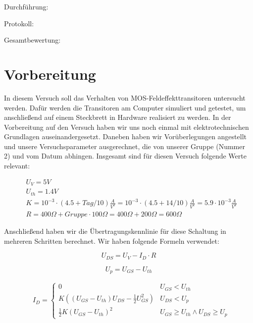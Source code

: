 \documentclass[12pt,a4paper]{scrartcl}
\begin{document}
Durchf\"uhrung:

Protokoll:

Gesamtbewertung:
\clearpage



\section{Vorbereitung}
In diesem Versuch soll das Verhalten von MOS-Feldeffekttransitoren untersucht werden.
Daf\"ur werden die Transitoren am Computer simuliert und getestet, um anschlie\ss end auf einem Steckbrett in Hardware realisiert zu werden.
In der Vorbereitung auf den Versuch haben wir uns noch einmal mit elektrotechnischen Grundlagen auseinandergesetzt.
Daneben haben wir Vor\"uberlegungen angestellt und unsere Versuchsparameter ausgerechnet, die von unserer Gruppe (Nummer 2) und vom Datum abhingen.
Insgesamt sind f\"ur diesen Versuch folgende Werte relevant:

\begin{align} \label{eq:geg}
&U_V = 5V \nonumber \\
&U_{th} = 1.4V \nonumber \\
&K = 10^{-3} \cdot (4.5 + Tag/10) \frac{A}{V^2} = 10^{-3} \cdot (4.5 + 14/10) \frac{A}{V^2} = 5.9 \cdot 10^{-3} \frac{A}{V^2} \nonumber \\
&R = 400\Omega + Gruppe \cdot 100\Omega = 400\Omega + 200\Omega = 600 \Omega
\end{align}

Anschlie\ss end haben wir die \"Ubertragungskennlinie f\"ur diese Schaltung in mehreren Schritten berechnet.
Wir haben folgende Formeln verwendet:

\begin{equation} \label{eq:UDS}
    U_{DS} = U_V - I_D \cdot R
\end{equation}

\begin{equation} \label{eq:Up}
    U_p = U_{GS} - U_{th}
\end{equation}

\begin{align} \label{eq:ID}
&I_D = \left\{
  \begin{array}{lr}
    0  & U_{GS} < U_{th}\\
    K((U_{GS} - U_{th})U_{DS} - \frac{1}{2}U_{GS}^2) & U_{DS} < U_p\\
    \frac{1}{2}K(U_{GS} - U_{th})^2 & U_{GS} \geq U_{th} \wedge U_{DS} \geq U_p
  \end{array}
\right.
\end{align}
\end{document}
